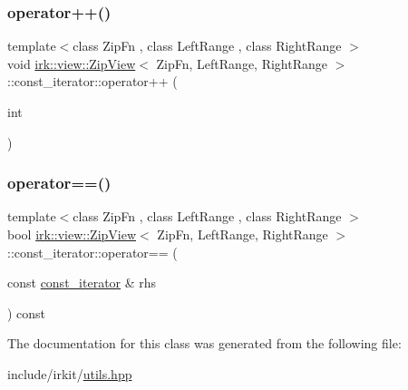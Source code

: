 \subsubsection{\texorpdfstring{operator++()}{operator++()}\hspace{0.1cm}{\footnotesize\ttfamily [2/2]}}
{\footnotesize\ttfamily template$<$class Zip\+Fn , class Left\+Range , class Right\+Range $>$ \\
void \mbox{\hyperlink{classirk_1_1view_1_1ZipView}{irk\+::view\+::\+Zip\+View}}$<$ Zip\+Fn, Left\+Range, Right\+Range $>$\+::const\+\_\+iterator\+::operator++ (\begin{DoxyParamCaption}\item[{int}]{ }\end{DoxyParamCaption})\hspace{0.3cm}{\ttfamily [inline]}}

\mbox{\label{classirk_1_1view_1_1ZipView_1_1const__iterator_a1ae00d4c143e3a594c228aedc41b322a}} 
\subsubsection{\texorpdfstring{operator==()}{operator==()}}
{\footnotesize\ttfamily template$<$class Zip\+Fn , class Left\+Range , class Right\+Range $>$ \\
bool \mbox{\hyperlink{classirk_1_1view_1_1ZipView}{irk\+::view\+::\+Zip\+View}}$<$ Zip\+Fn, Left\+Range, Right\+Range $>$\+::const\+\_\+iterator\+::operator== (\begin{DoxyParamCaption}\item[{const \mbox{\hyperlink{classirk_1_1view_1_1ZipView_1_1const__iterator}{const\+\_\+iterator}} \&}]{rhs }\end{DoxyParamCaption}) const\hspace{0.3cm}{\ttfamily [inline]}}



The documentation for this class was generated from the following file\+:\begin{DoxyCompactItemize}
\item 
include/irkit/\mbox{\hyperlink{utils_8hpp}{utils.\+hpp}}\end{DoxyCompactItemize}
